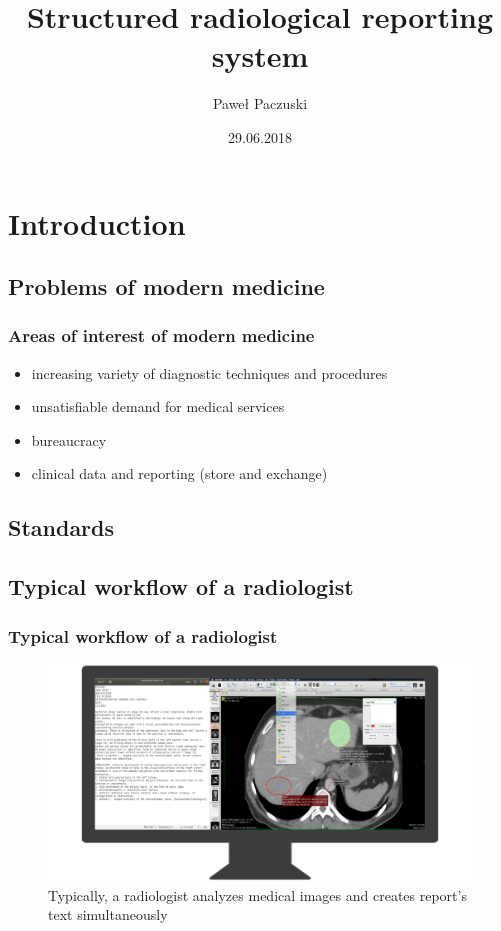 \documentclass{beamer}
\author{Paweł Paczuski }
\title{Structured radiological reporting system}
\date{29.06.2018}
\begin{document}
\begin{frame}
\titlepage
\end{frame}


\section{Introduction}
\subsection{Problems of modern medicine}
\begin{frame}
\frametitle{Areas of interest of modern medicine}
\begin{itemize}
	\item increasing variety of diagnostic techniques and procedures
	\item unsatisfiable demand for medical services
	\item bureaucracy
	\item clinical data and reporting (store and exchange)
\end{itemize}
\end{frame}


\subsection{Standards}
\subsection{Typical workflow of a radiologist}
\begin{frame}
\frametitle{Typical workflow of a radiologist}
\begin{figure}
	\centering
	\includegraphics[width=1\linewidth]{../workspace}
	\caption{Typically, a radiologist analyzes medical images and creates report's text simultaneously}
	\label{fig:workspace}
\end{figure}
\end{frame}
\end{document}
